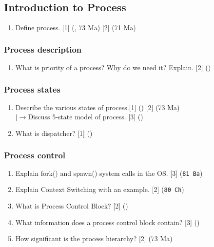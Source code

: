 \documentclass[12pt]{article}
\newcommand{\lb}{\\$\left|\rightarrow\right.$}
\begin{document}
	\subsection{Introduction to Process }
		\begin{enumerate}[noitemsep, topsep = 0pt]
			\item Define process. \hfill [1] (, 73 Ma) [2] (71 Ma)
		\end{enumerate}
	
		\subsubsection{Process description}
			\begin{enumerate}
				\item What is priority of a process? Why do we need it? Explain. \hfill [2] ()
			\end{enumerate}
		
		\subsubsection{Process states}
			\begin{enumerate}[noitemsep, topsep=0pt]
				\item Describe the various states of process.\hfill [1] () [2] (73 Ma)
				\lb Discuss 5-state model of process. \hfill [3] ()

				\item What is dispatcher? \hfill [1] ()
			\end{enumerate}
		
		\subsubsection{Process control}
			\begin{enumerate}[noitemsep, topsep = 0pt]
				\item Explain fork() and spawn() system calls in the OS. \hfill [3] (\texttt{81 Ba})
				
				\item Explain Context Switching with an example. \hfill [2] (\texttt{80 Ch})
				
				\item What is Process Control Block? \hfill [2] ()		
				
				\item What information does a process control block contain? \hfill [3] ()
				
				\item How significant is the process hierarchy? \hfill [2] (73 Ma)
			\end{enumerate}
	
\end{document}

